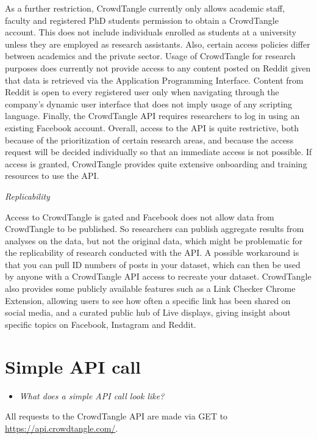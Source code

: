 \documentclass[
]{book}
\providecommand{\tightlist}{%
  \setlength{\itemsep}{0pt}\setlength{\parskip}{0pt}}
\begin{document}
As a further restriction, CrowdTangle currently only allows academic staff, faculty and registered PhD students permission to obtain a CrowdTangle account. This does not include individuals enrolled as students at a university unless they are employed as research assistants. Also, certain access policies differ between academics and the private sector. Usage of CrowdTangle for research purposes does currently not provide access to any content posted on Reddit given that data is retrieved via the Application Programming Interface. Content from Reddit is open to every registered user only when navigating through the company's dynamic user interface that does not imply usage of any scripting language.
Finally, the CrowdTangle API requires researchers to log in using an existing Facebook account.
Overall, access to the API is quite restrictive, both because of the prioritization of certain research areas, and because the access request will be decided individually so that an immediate access is not possible. If access is granted, CrowdTangle provides quite extensive onboarding and training resources to use the API.

\emph{Replicability}

Access to CrowdTangle is gated and Facebook does not allow data from CrowdTangle to be published. So researchers can publish aggregate results from analyses on the data, but not the original data, which might be problematic for the replicability of research conducted with the API. A possible workaround is that you can pull ID numbers of posts in your dataset, which can then be used by anyone with a CrowdTangle API access to recreate your dataset.
CrowdTangle also provides some publicly available features such as a Link Checker Chrome Extension, allowing users to see how often a specific link has been shared on social media, and a curated public hub of Live displays, giving insight about specific topics on Facebook, Instagram and Reddit.

\hypertarget{simple-api-call-2}{%
\section{Simple API call}\label{simple-api-call-2}}

\begin{itemize}
\tightlist
\item
  \emph{What does a simple API call look like?}
\end{itemize}

All requests to the CrowdTangle API are made via GET to \url{https://api.crowdtangle.com/}.
\end{document}
